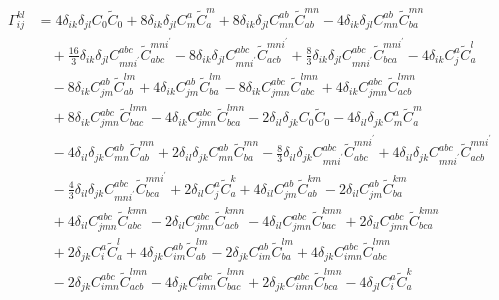 \begin{align}
\Gamma^{kl}_{ij} &= 4 \delta_{ik} \delta_{jl} C_{0} \widetilde{C}_{0} + 8 \delta_{ik} \delta_{jl} C^{a}_{m} \widetilde{C}^{m}_{a} + 8 \delta_{ik} \delta_{jl} C^{ab}_{mn} \widetilde{C}^{mn}_{ab} - 4 \delta_{ik} \delta_{jl} C^{ab}_{mn} \widetilde{C}^{mn}_{ba} \\
&\quad {}+ \frac{16}{3} \delta_{ik} \delta_{jl} C^{abc}_{mni^{\prime}} \widetilde{C}^{mni^{\prime}}_{abc} - 8 \delta_{ik} \delta_{jl} C^{abc}_{mni^{\prime}} \widetilde{C}^{mni^{\prime}}_{acb} + \frac{8}{3} \delta_{ik} \delta_{jl} C^{abc}_{mni^{\prime}} \widetilde{C}^{mni^{\prime}}_{bca} - 4 \delta_{ik} C^{a}_{j} \widetilde{C}^{l}_{a} \\
&\quad -8 \delta_{ik} C^{ab}_{jm} \widetilde{C}^{lm}_{ab} + 4 \delta_{ik} C^{ab}_{jm} \widetilde{C}^{lm}_{ba} - 8 \delta_{ik} C^{abc}_{jmn} \widetilde{C}^{lmn}_{abc} + 4 \delta_{ik} C^{abc}_{jmn} \widetilde{C}^{lmn}_{acb} \\
&\quad {}+ 8 \delta_{ik} C^{abc}_{jmn} \widetilde{C}^{lmn}_{bac} - 4 \delta_{ik} C^{abc}_{jmn} \widetilde{C}^{lmn}_{bca} - 2 \delta_{il} \delta_{jk} C_{0} \widetilde{C}_{0} - 4 \delta_{il} \delta_{jk} C^{a}_{m} \widetilde{C}^{m}_{a} \\
&\quad -4 \delta_{il} \delta_{jk} C^{ab}_{mn} \widetilde{C}^{mn}_{ab} + 2 \delta_{il} \delta_{jk} C^{ab}_{mn} \widetilde{C}^{mn}_{ba} - \frac{8}{3} \delta_{il} \delta_{jk} C^{abc}_{mni^{\prime}} \widetilde{C}^{mni^{\prime}}_{abc} + 4 \delta_{il} \delta_{jk} C^{abc}_{mni^{\prime}} \widetilde{C}^{mni^{\prime}}_{acb} \\
&\quad -\frac{4}{3} \delta_{il} \delta_{jk} C^{abc}_{mni^{\prime}} \widetilde{C}^{mni^{\prime}}_{bca} + 2 \delta_{il} C^{a}_{j} \widetilde{C}^{k}_{a} + 4 \delta_{il} C^{ab}_{jm} \widetilde{C}^{km}_{ab} - 2 \delta_{il} C^{ab}_{jm} \widetilde{C}^{km}_{ba} \\
&\quad {}+ 4 \delta_{il} C^{abc}_{jmn} \widetilde{C}^{kmn}_{abc} - 2 \delta_{il} C^{abc}_{jmn} \widetilde{C}^{kmn}_{acb} - 4 \delta_{il} C^{abc}_{jmn} \widetilde{C}^{kmn}_{bac} + 2 \delta_{il} C^{abc}_{jmn} \widetilde{C}^{kmn}_{bca} \\
&\quad {}+ 2 \delta_{jk} C^{a}_{i} \widetilde{C}^{l}_{a} + 4 \delta_{jk} C^{ab}_{im} \widetilde{C}^{lm}_{ab} - 2 \delta_{jk} C^{ab}_{im} \widetilde{C}^{lm}_{ba} + 4 \delta_{jk} C^{abc}_{imn} \widetilde{C}^{lmn}_{abc} \\
&\quad -2 \delta_{jk} C^{abc}_{imn} \widetilde{C}^{lmn}_{acb} - 4 \delta_{jk} C^{abc}_{imn} \widetilde{C}^{lmn}_{bac} + 2 \delta_{jk} C^{abc}_{imn} \widetilde{C}^{lmn}_{bca} - 4 \delta_{jl} C^{a}_{i} \widetilde{C}^{k}_{a} \\

\end{align}
